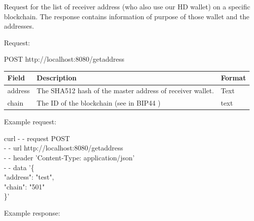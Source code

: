 Request for the list of receiver address (who also use our HD wallet) on a specific blockchain. The response contains information of purpose of those wallet and the addresses.

Request:

\begin{framed}
    POST http://localhost:8080/getaddress
\end{framed}

\begin{tabular}{| m{3cm} | m{9cm} | m{2.7cm} |}
    \hline
    Field & Description & Format                                            \\ \hline
    address & The SHA512 hash of the master address of receiver wallet. & Text   \\ \hline
    chain   & The ID of the blockchain (see in BIP44 \cite{bip44}) & text    \\ \hline
\end{tabular}

Example request:

\begin{framed}
\hspace*{13mm}    curl - - request POST \\
\hspace*{13mm}        - - url http://localhost:8080/getaddress \\
\hspace*{13mm}        - - header 'Content-Type: application/json' \\
\hspace*{13mm}        - - data '\{ \\
\hspace*{20mm}                "address": "test", \\
\hspace*{20mm}                "chain": "501" \\
\hspace*{20mm}            \}' \\
\end{framed}


Example response:

